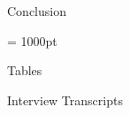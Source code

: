 \documentclass[12pt]{article}
\begin{document}
 \begin{section}{Conclusion}
 
     
 
 \end{section}
 
 \clearpage
 \hfuzz = 1000pt
 \printbibliography
 
 \appendix
 \begin{section}{Tables}
    \label{appendix:tables}
     
 \end{section}
 
 \begin{section}{Interview Transcripts}
     
 \end{section}

 
\end{document}
